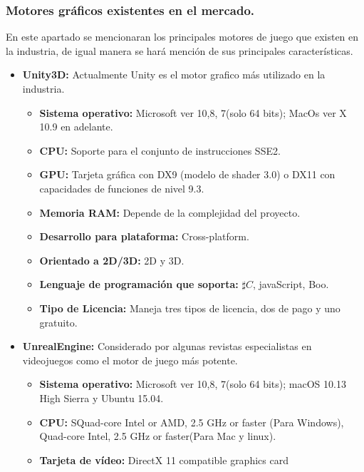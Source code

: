  
 \subsubsection{Motores gráficos existentes en el mercado.}
En este apartado se mencionaran los principales motores de juego que existen en la 
industria, de igual manera se hará mención de sus principales características.

	\begin{itemize}
		\item \textbf{Unity3D:} Actualmente Unity es el motor grafico más utilizado 
		en la industria. 
			\begin{itemize}
				\item \textbf{Sistema operativo:} Microsoft ver 10,8, 7(solo 64 bits);
				 MacOs ver X 10.9 en adelante.
				\item \textbf{CPU:} Soporte para el conjunto de instrucciones SSE2.
				\item \textbf{GPU:} Tarjeta gráfica con DX9 (modelo de shader 3.0) o 
				DX11 con capacidades de funciones de nivel 9.3.
				\item \textbf{Memoria RAM:} Depende de la complejidad del proyecto.
				\item \textbf{Desarrollo para plataforma:} Cross-platform.
				\item \textbf{Orientado a 2D/3D:} 2D y 3D.
				\item \textbf{Lenguaje de programación que soporta:} $\sharp C$, 
				javaScript, Boo.
				\item \textbf{Tipo de Licencia:} Maneja tres tipos de licencia, dos de 
				pago y uno gratuito. \cite{Ref:Unity} 
			\end{itemize}		
		\item \textbf{UnrealEngine:} Considerado por algunas revistas especialistas en 
		videojuegos como el motor de juego más potente. 
			\begin{itemize}
				\item \textbf{Sistema operativo:} Microsoft ver 10,8, 7(solo 64 bits); 
				macOS 10.13 High Sierra y Ubuntu 15.04.
				\item \textbf{CPU:} SQuad-core Intel or AMD, 2.5 GHz or faster (Para 
				Windows), Quad-core Intel, 2.5 GHz or faster(Para Mac y linux).
				\item \textbf{Tarjeta de vídeo:} DirectX 11 compatible graphics card 

\end{itemize}
\end{itemize}
